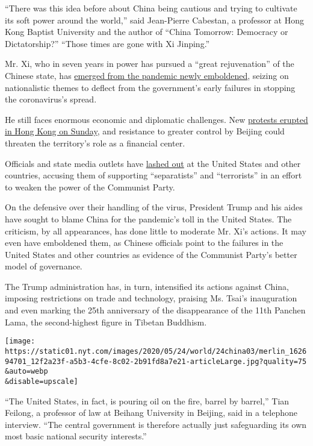 ``There was this idea before about China being cautious and trying to
cultivate its soft power around the world,'' said Jean-Pierre Cabestan,
a professor at Hong Kong Baptist University and the author of ``China
Tomorrow: Democracy or Dictatorship?'' ``Those times are gone with Xi
Jinping.''

Mr. Xi, who in seven years in power has pursued a ``great rejuvenation''
of the Chinese state, has
\href{https://www.nytimes.com/2020/05/20/world/asia/coronavirus-china-xi-jinping.html}{emerged
from the pandemic newly emboldened}, seizing on nationalistic themes to
deflect from the government's early failures in stopping the
coronavirus's spread.

He still faces enormous economic and diplomatic challenges. New
\href{https://www.nytimes.com/2020/05/24/world/asia/hong-kong-protest-coronavirus-china.html}{protests
erupted in Hong Kong on Sunday}, and resistance to greater control by
Beijing could threaten the territory's role as a financial center.

Officials and state media outlets have
\href{https://www.nytimes.com/2020/05/23/world/asia/china-hong-kong-propaganda.html}{lashed
out} at the United States and other countries, accusing them of
supporting ``separatists'' and ``terrorists'' in an effort to weaken the
power of the Communist Party.

On the defensive over their handling of the virus, President Trump and
his aides have sought to blame China for the pandemic's toll in the
United States. The criticism, by all appearances, has done little to
moderate Mr. Xi's actions. It may even have emboldened them, as Chinese
officials point to the failures in the United States and other countries
as evidence of the Communist Party's better model of governance.

The Trump administration has, in turn, intensified its actions against
China, imposing restrictions on trade and technology, praising Ms.
Tsai's inauguration and even marking the 25th anniversary of the
disappearance of the 11th Panchen Lama, the second-highest figure in
Tibetan Buddhism.

\texttt{[image: https://static01.nyt.com/images/2020/05/24/world/24china03/merlin\_162694701\_12f2a23f-a5b3-4cfe-8c02-2b91fd8a7e21-articleLarge.jpg?quality=75\\\&auto=webp\\\&disable=upscale]}

``The United States, in fact, is pouring oil on the fire, barrel by
barrel,'' Tian Feilong, a professor of law at Beihang University in
Beijing, said in a telephone interview. ``The central government is
therefore actually just safeguarding its own most basic national
security interests.''

